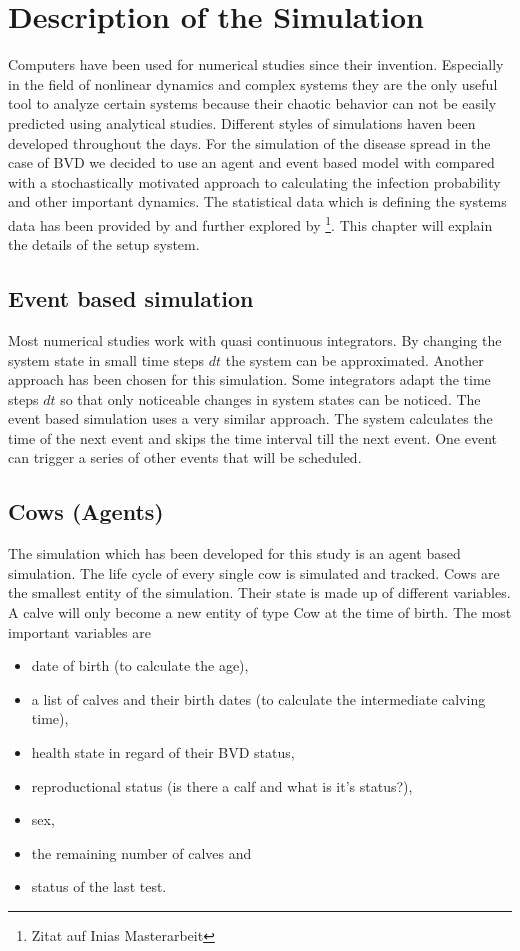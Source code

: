 \chapter{Description of the Simulation}
Computers have been used for numerical studies since their invention. Especially in the field of nonlinear dynamics and complex systems they are the only useful tool to analyze certain systems because their chaotic behavior can not be easily predicted using analytical studies. Different styles of simulations haven been developed throughout the days. For the simulation of the disease spread in the case of BVD we decided to use an agent and event based model with compared with a stochastically motivated approach to calculating the infection probability and other important dynamics. The statistical data which is defining the systems data has been provided by \citep{personalCom} and further explored by \footnote{Zitat auf Inias Masterarbeit}. This chapter will explain the details of the setup system.
\section{Event based simulation}
Most numerical studies work with quasi continuous integrators. By changing the system state in small time steps $dt$ the system can be approximated. Another approach has been chosen for this simulation. Some integrators adapt the time steps $dt$ so that only noticeable changes in system states can be noticed. The event based simulation uses a very similar approach. The system calculates the time of the next event and skips the time interval till the next event. One event can trigger a series of other events that will be scheduled. 
\section{Cows (Agents)}
The simulation which has been developed for this study is an agent based simulation. The life cycle of every single cow is simulated and tracked. Cows are the smallest entity of the simulation. Their state is made up of different variables. A calve will only become a new entity of type Cow at the time of birth. The most important variables are 
\begin{itemize}
\item date of birth (to calculate the age),
\item a list of calves and their birth dates (to calculate the intermediate calving time),
\item health state in regard of their BVD status,
\item reproductional status (is there a calf and what is it's status?),
\item sex,
\item the remaining number of calves and
\item status of the last test.
\end{itemize}

